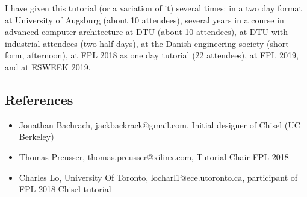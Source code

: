 \documentclass{article}
\begin{document}


I have given this tutorial (or a variation of it) several times:
in a two day format at University of Augsburg (about 10 attendees), several years
in a course in advanced computer architecture at DTU (about 10 attendees), at DTU with industrial attendees
(two half days), at the Danish engineering society (short form, afternoon),
at FPL 2018 as one day tutorial (22 attendees), at FPL 2019, and at ESWEEK 2019.


\subsection*{References}

\begin{itemize}
\item Jonathan Bachrach, jackbackrack@gmail.com, Initial designer of Chisel (UC Berkeley)
\item Thomas Preusser, thomas.preusser@xilinx.com, Tutorial Chair FPL 2018
\item Charles Lo, University Of Toronto, locharl1@ece.utoronto.ca, participant of FPL 2018 Chisel tutorial
\end{itemize}
\end{document}
